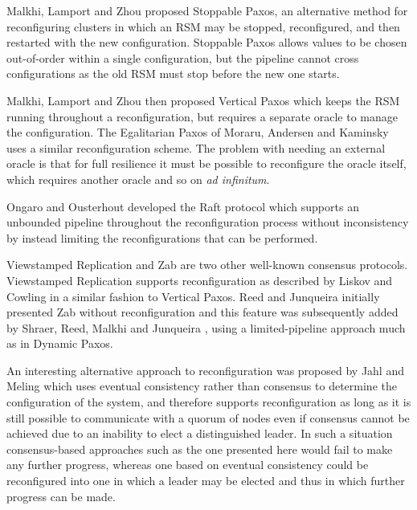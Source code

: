 \documentclass[journal]{IEEEtran}
\begin{document}
Malkhi, Lamport and Zhou \cite{stoppable-paxos} proposed Stoppable Paxos, an
alternative method for reconfiguring clusters in which an RSM may be stopped,
reconfigured, and then restarted with the new configuration. Stoppable Paxos
allows values to be chosen out-of-order within a single configuration, but the
pipeline cannot cross configurations as the old RSM must stop before the new
one starts.

Malkhi, Lamport and Zhou \cite{vertical-paxos} then proposed Vertical Paxos
which keeps the RSM running throughout a reconfiguration, but requires a
separate oracle to manage the configuration. The Egalitarian Paxos of Moraru,
Andersen and Kaminsky \cite{egalitarian-paxos} uses a similar reconfiguration
scheme.  The problem with needing an external oracle is that for full
resilience it must be possible to reconfigure the oracle itself, which requires
another oracle and so on \textit{ad infinitum}.

Ongaro and Ousterhout \cite{raft} developed the Raft protocol which supports an
unbounded pipeline throughout the reconfiguration process without inconsistency
by instead limiting the reconfigurations that can be performed.

Viewstamped Replication and Zab are two other well-known consensus protocols.
Viewstamped Replication supports reconfiguration as described by Liskov and
Cowling \cite{viewstamped-replication} in a similar fashion to Vertical Paxos.
Reed and Junqueira \cite{zab} initially presented Zab without reconfiguration
and this feature was subsequently added by Shraer, Reed, Malkhi and Junqueira
\cite{zab-reconf}, using a limited-pipeline approach much as in Dynamic Paxos.

An interesting alternative approach to reconfiguration was proposed by Jahl and
Meling \cite{async-reconfig} which uses eventual consistency rather than
consensus to determine the configuration of the system, and therefore supports
reconfiguration as long as it is still possible to communicate with a quorum of
nodes even if consensus cannot be achieved due to an inability to elect a
distinguished leader. In such a situation consensus-based approaches such as
the one presented here would fail to make any further progress, whereas one
based on eventual consistency could be reconfigured into one in which a leader
may be elected and thus in which further progress can be made.

\def\prep#1{\mathbf{prepare}(#1)}
\def\mprom#1#2#3{\mathbf{promised}_{\ge #1}(#2,#3)}
\def\fprom#1#2#3{\mathbf{promised}_{#1}(#2,#3)}
\def\bprom#1#2#3#4{\mathbf{promised}_{#1}(#2,#3;#4)}
\def\prop#1#2{\mathbf{proposed}_{#1}(#2)}
\def\acc#1#2#3{\mathbf{accepted}_{#1}(#2,#3)}
\def\chosen#1#2{\mathbf{chosen}_{#1}(#2)}
\def\owner#1{\mathrm{owner}(#1)}
\end{document}
